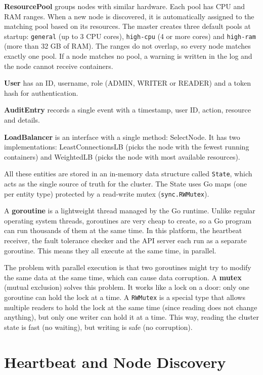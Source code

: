 \textbf{ResourcePool} groups nodes with similar hardware. Each pool has CPU and RAM ranges. When a new node is discovered, it is automatically assigned to the matching pool based on its resources. The master creates three default pools at startup: \texttt{general} (up to 3 CPU cores), \texttt{high-cpu} (4 or more cores) and \texttt{high-ram} (more than 32 GB of RAM). The ranges do not overlap, so every node matches exactly one pool. If a node matches no pool, a warning is written in the log and the node cannot receive containers.

\textbf{User} has an ID, username, role (ADMIN, WRITER or READER) and a token hash for authentication.

\textbf{AuditEntry} records a single event with a timestamp, user ID, action, resource and details.

\textbf{LoadBalancer} is an interface with a single method: SelectNode. It has two implementations: LeastConnectionsLB (picks the node with the fewest running containers) and WeightedLB (picks the node with most available resources).

All these entities are stored in an in-memory data structure called \texttt{State}, which acts as the single source of truth for the cluster. The State uses Go maps (one per entity type) protected by a read-write mutex (\texttt{sync.RWMutex}).

A \textbf{goroutine} is a lightweight thread managed by the Go runtime. Unlike regular operating system threads, goroutines are very cheap to create, so a Go program can run thousands of them at the same time. In this platform, the heartbeat receiver, the fault tolerance checker and the API server each run as a separate goroutine. This means they all execute at the same time, in parallel.

The problem with parallel execution is that two goroutines might try to modify the same data at the same time, which can cause data corruption. A \textbf{mutex} (mutual exclusion) solves this problem. It works like a lock on a door: only one goroutine can hold the lock at a time. A \texttt{RWMutex} is a special type that allows multiple readers to hold the lock at the same time (since reading does not change anything), but only one writer can hold it at a time. This way, reading the cluster state is fast (no waiting), but writing is safe (no corruption).

\section{Heartbeat and Node Discovery}

